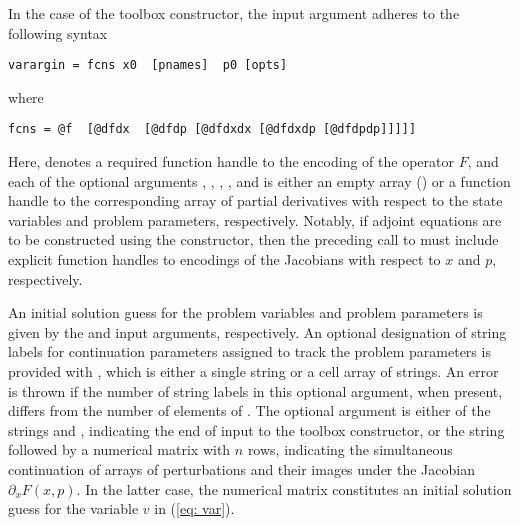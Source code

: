 In the case of the  toolbox constructor, the  input argument adheres to the following syntax
\begin{lstlisting}[language=coco-highlight]
varargin = fcns x0  [pnames]  p0 [opts]
\end{lstlisting}
where
\begin{lstlisting}[language=coco-highlight]
fcns = @f  [@dfdx  [@dfdp [@dfdxdx [@dfdxdp [@dfdpdp]]]]]
\end{lstlisting}
Here,  denotes a required function handle to the encoding of the operator $F$, and each of the optional arguments , , , , and  is either an empty array (\mcode{[]}) or a function handle to the corresponding array of partial derivatives with respect to the state variables and problem parameters, respectively. Notably, if adjoint equations are to be constructed using the  constructor, then the preceding call to  must include explicit function handles to encodings of the Jacobians with respect to $x$ and $p$, respectively.

An initial solution guess for the problem variables and problem parameters is given by the  and  input arguments, respectively. An optional designation of string labels for continuation parameters assigned to track the problem parameters is provided with , which is either a single string or a cell array of strings. An error is thrown if the number of string labels in this optional argument, when present, differs from the number of elements of . The optional  argument is either of the strings  and , indicating the end of input to the  toolbox constructor, or the string  followed by a numerical matrix with $n$ rows, indicating the simultaneous continuation of arrays of perturbations and their images under the Jacobian $\partial_x F(x,p)$. In the latter case, the numerical matrix constitutes an initial solution guess for the variable $v$ in (\ref{eq: var}).

